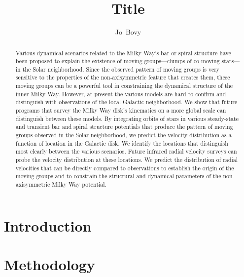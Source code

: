 \documentclass[12pt,preprint]{aastex}
\begin{document}
\title{Title}
\author{Jo~Bovy}%

\begin{abstract}
Various dynamical scenarios related to the Milky Way's bar or spiral
structure have been proposed to explain the existence of moving
groups---clumps of co-moving stars---in the Solar neighborhood. Since
the observed pattern of moving groups is very sensitive to the
properties of the non-axisymmetric feature that creates them, these
moving groups can be a powerful tool in constraining the dynamical
structure of the inner Milky Way. However, at present the various
models are hard to confirm and distinguish with observations of the
local Galactic neighborhood. We show that future programs that survey
the Milky Way disk's kinematics on a more global scale can distinguish
between these models. By integrating orbits of stars in various
steady-state and transient bar and spiral structure potentials that
produce the pattern of moving groups observed in the Solar
neighborhood, we predict the velocity distribution as a function of
location in the Galactic disk. We identify the locations that
distinguish most clearly between the various scenarios. Future
infrared radial velocity surveys can probe the velocity distribution
at these locations. We predict the distribution of radial velocities
that can be directly compared to observations to establish the origin
of the moving groups and to constrain the structural and dynamical
parameters of the non-axisymmetric Milky Way potential.
\end{abstract}


\section{Introduction}




\section{Methodology}
\end{document}
